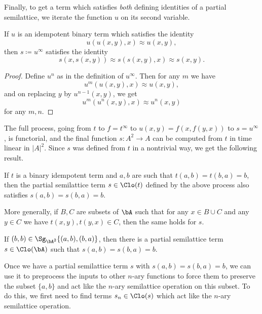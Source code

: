 Finally, to get a term which satisfies \emph{both} defining identities of a partial semilattice, we iterate the function $u$ on its second variable.

\begin{prop} If $u$ is an idempotent binary term which satisfies the identity
\[
u(u(x,y),x) \approx u(x,y),
\]
then $s \coloneqq u^\infty$ satisfies the identity
\[
s(x,s(x,y)) \approx s(s(x,y),x) \approx s(x,y).
\]
\end{prop}
\begin{proof} Define $u^n$ as in the definition of $u^\infty$. Then for any $m$ we have
\[
u^m(u(x,y),x) \approx u(x,y),
\]
and on replacing $y$ by $u^{n-1}(x,y)$, we get
\[
u^m(u^n(x,y),x) \approx u^n(x,y)
\]
for any $m,n$.
\end{proof}

The full process, going from $t$ to $f = t^\infty$ to $u(x,y) = f(x,f(y,x))$ to $s = u^\infty$, is functorial, and the final function $s : A^2 \rightarrow A$ can be computed from $t$ in time linear in $|A|^2$. Since $s$ was defined from $t$ in a nontrivial way, we get the following result.

\begin{prop}\label{prop-semilattice-iteration} If $t$ is a binary idempotent term and $a,b$ are such that $t(a,b) = t(b,a) = b$, then the partial semilattice term $s \in \Clo(t)$ defined by the above process also satisfies $s(a,b) = s(b,a) = b$.

More generally, if $B,C$ are subsets of $\bA$ such that for any $x \in B\cup C$ and any $y \in C$ we have $t(x,y), t(y,x) \in C$, then the same holds for $s$.
\end{prop}

\begin{cor} If $(b,b) \in \Sg_{\bA^2}\{(a,b), (b,a)\}$, then there is a partial semilattice term $s \in \Clo(\bA)$ such that $s(a,b) = s(b,a) = b$.
\end{cor}

Once we have a partial semilattice term $s$ with $s(a,b) = s(b,a) = b$, we can use it to preprocess the inputs to other $n$-ary functions to force them to preserve the subset $\{a,b\}$ and act like the $n$-ary semilattice operation on this subset. To do this, we first need to find terms $s_n \in \Clo(s)$ which act like the $n$-ary semilattice operation.

